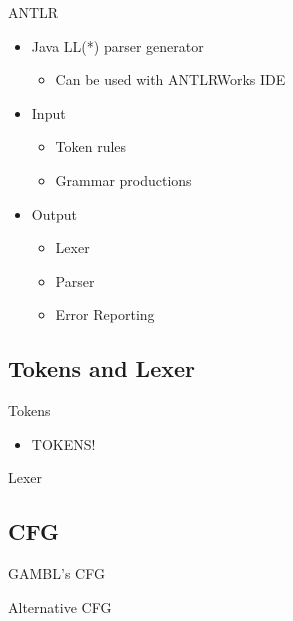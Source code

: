 \begin{frame}{ANTLR}
 \begin{itemize}
    \item Java LL(*) parser generator
    \begin{itemize}
      \item Can be used with ANTLRWorks IDE
    \end{itemize}
    \item Input
    \begin{itemize}
      \item Token rules
      \item Grammar productions
    \end{itemize}
    \item Output
    \begin{itemize}
      \item Lexer
      \item Parser
      \item Error Reporting
    \end{itemize}
  \end{itemize}
\end{frame}

\subsection{Tokens and Lexer}
\begin{frame}{Tokens}
  \begin{itemize}
    \item TOKENS!
  \end{itemize}
\end{frame}

\begin{frame}{Lexer}

\end{frame}


\subsection{CFG}
\begin{frame}{GAMBL's CFG}

\end{frame}

\begin{frame}{Alternative CFG}

\end{frame}
